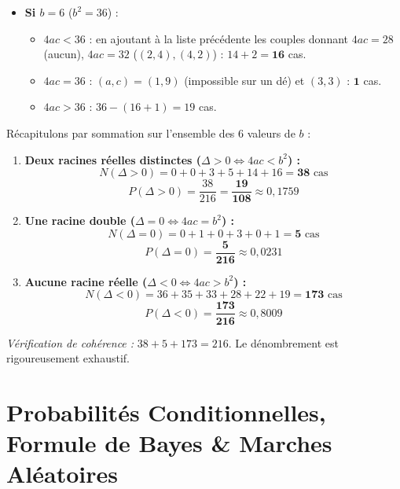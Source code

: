 \documentclass[11pt,a4paper]{article}
\begin{document}
\begin{correctionbox}
\begin{itemize}[label=$\bullet$]
\begin{itemize}
        \item $4ac = 25$ : $0$ cas.
        \item $4ac > 25$ : $36 - 14 = 22$ cas.
    \end{itemize}
    \item \textbf{Si $b = 6$} ($b^2 = 36$) :
    \begin{itemize}
        \item $4ac < 36$ : en ajoutant à la liste précédente les couples donnant $4ac = 28$ (aucun), $4ac = 32$ ($(2, 4), (4, 2)$) : $14 + 2 = \mathbf{16}$ cas.
        \item $4ac = 36$ : $(a, c) = (1, 9)$ (impossible sur un dé) et $(3, 3)$ : $\mathbf{1}$ cas.
        \item $4ac > 36$ : $36 - (16 + 1) = 19$ cas.
    \end{itemize}
\end{itemize}

Récapitulons par sommation sur l'ensemble des 6 valeurs de $b$ :
\begin{enumerate}[label=\arabic*.]
    \item \textbf{Deux racines réelles distinctes ($\Delta > 0 \iff 4ac < b^2$) :}
    \[
    N(\Delta > 0) = 0 + 0 + 3 + 5 + 14 + 16 = \mathbf{38} \text{ cas}
    \]
    \[
    P(\Delta > 0) = \frac{38}{216} = \mathbf{\frac{19}{108}} \approx 0{,}1759
    \]

    \item \textbf{Une racine double ($\Delta = 0 \iff 4ac = b^2$) :}
    \[
    N(\Delta = 0) = 0 + 1 + 0 + 3 + 0 + 1 = \mathbf{5} \text{ cas}
    \]
    \[
    P(\Delta = 0) = \mathbf{\frac{5}{216}} \approx 0{,}0231
    \]

    \item \textbf{Aucune racine réelle ($\Delta < 0 \iff 4ac > b^2$) :}
    \[
    N(\Delta < 0) = 36 + 35 + 33 + 28 + 22 + 19 = \mathbf{173} \text{ cas}
    \]
    \[
    P(\Delta < 0) = \mathbf{\frac{173}{216}} \approx 0{,}8009
    \]
\end{enumerate}
\emph{Vérification de cohérence :} $38 + 5 + 173 = 216$. Le dénombrement est rigoureusement exhaustif.
\end{correctionbox}

\vspace{0.4cm}

\section{Probabilités Conditionnelles, Formule de Bayes \& Marches Aléatoires}
\end{document}
